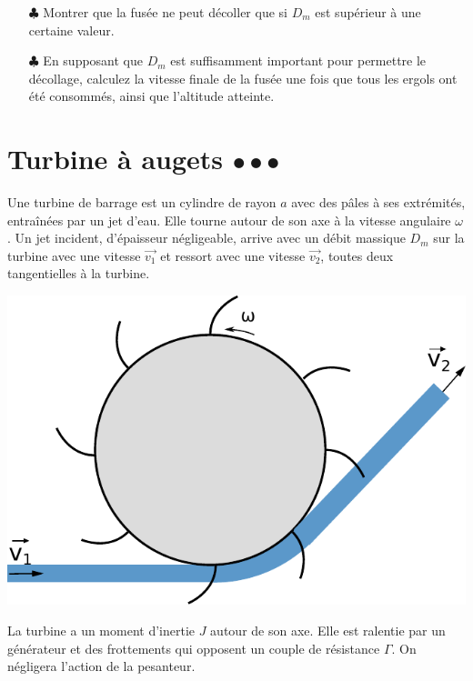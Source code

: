 \documentclass{report}
\begin{document}
\begin{itemize}

\item[$\clubsuit$] Montrer que la fusée ne peut décoller que si $D_m$ est supérieur à une certaine valeur.
\item[$\clubsuit$] En supposant que $D_m$ est suffisamment important pour permettre le décollage, calculez la vitesse finale de la fusée une fois que tous les ergols ont été consommés, ainsi que l'altitude atteinte.

\end{itemize}

\newpage

\section*{Turbine à augets $\bullet\bullet\bullet$}

Une turbine de barrage est un cylindre de rayon $a$ avec des pâles à ses extrémités, entraînées par un jet d'eau. Elle tourne autour de son axe à la vitesse angulaire $\omega$. Un jet incident, d'épaisseur négligeable, arrive avec un débit massique $D_m$ sur la turbine avec une vitesse $\vec{v_1}$ et ressort avec une vitesse $\vec{v_2}$, toutes deux tangentielles à la turbine.

\begin{center}
	\includegraphics[scale=0.5]{meca_flu7.pdf}
\end{center}

La turbine a un moment d'inertie $J$ autour de son axe. Elle est ralentie par un générateur et des frottements qui opposent un couple de résistance $\Gamma$. On négligera l'action de la pesanteur.
\end{document}
